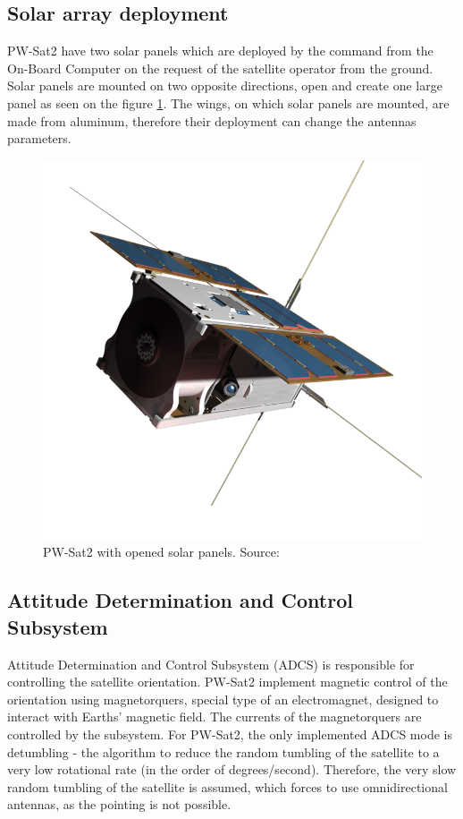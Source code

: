 \subsection{Solar array deployment}
PW-Sat2 have two solar panels which are deployed by the command from the On-Board Computer on the request of the satellite operator from the ground. Solar panels are mounted on two opposite directions, open and create one large panel as seen on the figure \ref{PW-Sat_solar_panels}. The wings, on which solar panels are mounted, are made from aluminum, therefore their deployment can change the antennas parameters.
\begin{figure}
    \centering
    \includegraphics[width=0.38\paperwidth]{img/1/pwsat_solar_panels.png}
    \caption{PW-Sat2 with opened solar panels. Source: \cite{PW_sat2_photo}}
    \label{PW-Sat_solar_panels}
\end{figure}



\subsection{Attitude Determination and Control Subsystem}
Attitude Determination and Control Subsystem (ADCS) is responsible for controlling the satellite orientation. PW-Sat2 implement magnetic control of the orientation using magnetorquers, special type of an electromagnet, designed to interact with Earths' magnetic field. The currents of the magnetorquers are controlled by the subsystem. For PW-Sat2, the only implemented ADCS mode is detumbling - the algorithm to reduce the random tumbling of the satellite to a very low rotational rate (in the order of degrees/second). Therefore, the very slow random tumbling of the satellite is assumed, which forces to use omnidirectional antennas, as the pointing is not possible.

